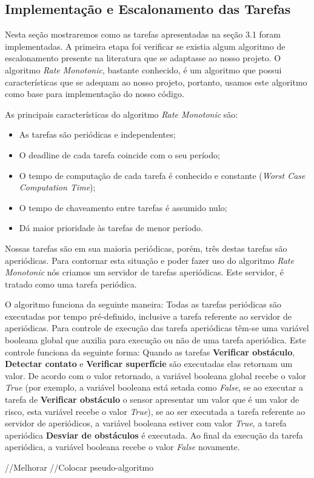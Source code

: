 \newpage

\subsection{Implementação e Escalonamento das Tarefas}

Nesta seção mostraremos como as tarefas apresentadas na seção 3.1 foram implementadas. A primeira etapa foi verificar se existia algum algoritmo de escalonamento presente na literatura que se adaptasse ao nosso projeto. O algoritmo \textit{Rate Monotonic}, bastante conhecido, é um algoritmo que possui características que se adequam ao nosso projeto, portanto, usamos este algoritmo como base para implementação do nosso código.

As principais características do algoritmo \textit{Rate Monotonic} são:

\begin{itemize}
	
	\item As tarefas são periódicas e independentes;
	
	\item O deadline de cada tarefa coincide com o seu período;
	
	\item O tempo de computação de cada tarefa é conhecido e constante (\textit{Worst Case Computation Time});
	
	\item O tempo de chaveamento entre tarefas é assumido nulo;
	
	\item Dá maior prioridade às tarefas de menor período.
	
\end{itemize}

Nossas tarefas são em sua maioria periódicas, porém, três destas tarefas são aperiódicas. Para contornar esta situação e poder fazer uso do algoritmo \textit{Rate Monotonic} nós criamos um servidor de tarefas aperiódicas. Este servidor, é tratado como uma tarefa periódica. 

O algoritmo funciona da seguinte maneira: Todas as tarefas periódicas são executadas por tempo pré-definido, inclusive a tarefa referente ao servidor de aperiódicas. Para controle de execução das tarefa aperiódicas têm-se uma variável booleana global que auxilia para execução ou não de uma tarefa aperiódica. Este controle funciona da seguinte forma: Quando as tarefas \textbf{Verificar obstáculo}, \textbf{Detectar contato} e \textbf{Verificar superfície} são executadas elas retornam um valor. De acordo com o valor retornado, a variável booleana global  recebe o valor \textit{True} (por exemplo,  a variável booleana está setada como \textit{False}, se ao executar a tarefa de \textbf{Verificar obstáculo} o sensor apresentar um valor que é um valor de risco, esta variável recebe o valor \textit{True}), se ao ser executada a tarefa referente ao servidor de aperiódicos, a variável booleana estiver com valor \textit{True}, a tarefa aperiódica \textbf{Desviar de obstáculos} é executada. Ao final da execução da tarefa aperiódica, a variável booleana recebe o valor \textit{False} novamente.

//Melhorar
//Colocar pseudo-algoritmo

